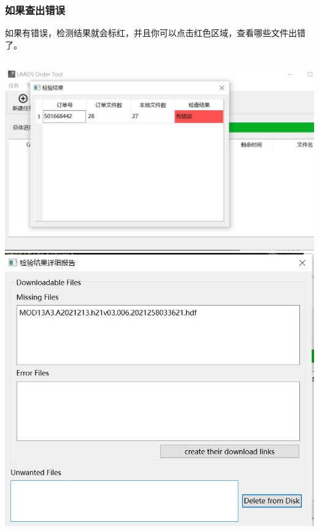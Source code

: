 \begin{frame}
    \frametitle{如果查出错误}
    如果有错误，检测结果就会标红，并且你可以点击红色区域，查看哪些文件出错了。
    \begin{columns}
        \includegraphics[width=\linewidth]{images/2B.14有错误.jpg}
        \includegraphics[width=\linewidth]{images/2B.15错误报告.jpg}
    \end{columns}
\end{frame}